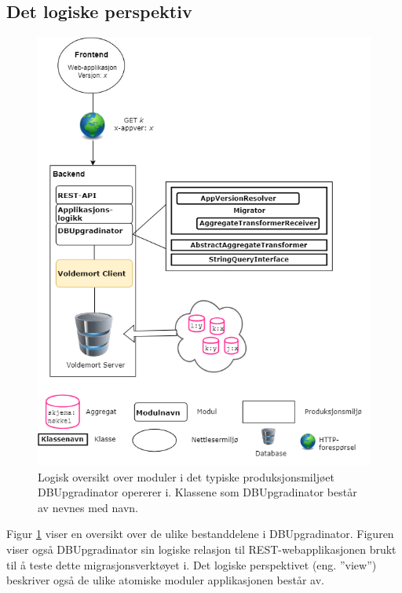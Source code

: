 \subsection{Det logiske perspektiv}
\begin{figure}[!ht]
    \centering
    \includegraphics[scale=0.6]{fig/dbupgradinator-logisk-1.png}
    \caption{Logisk oversikt over moduler i det typiske produksjonsmiljøet DBUpgradinator opererer i. Klassene som DBUpgradinator består av nevnes med navn.}
    \label{fig5}
\end{figure}

\newpage

Figur \ref{fig5} viser en oversikt over de ulike bestanddelene i DBUpgradinator. Figuren viser også DBUpgradinator sin logiske relasjon til REST-webapplikasjonen brukt til å teste dette migrasjonsverktøyet i. Det logiske perspektivet (eng. ''view'') beskriver også de ulike atomiske moduler applikasjonen består av.

